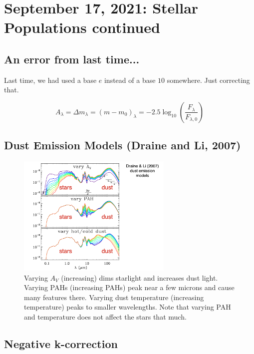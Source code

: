 \documentclass{article}
\begin{document}
\section{September 17, 2021: Stellar Populations continued}

\subsection{An error from last time...}

Last time, we had used a base $e$ instead of a base $10$ somewhere. Just correcting that. 

\begin{equation}
    A_\lambda = \Delta m_\lambda = \left(m-m_0\right)_\lambda = -2.5\log_{10}\left(\frac{F_\lambda}{F_{\lambda,0}}\right)
\end{equation}

\subsection{Dust Emission Models (Draine and Li, 2007)}

\begin{figure}
    \centering
    \includegraphics[width=0.66\textwidth]{figs/Screen Shot 2021-09-24 at 9.29.29 AM.png}
    \caption{Varying $A_V$ (increasing) dims starlight and increases dust light. Varying PAHs (increasing PAHs) peak near a few microns and cause many features there. Varying dust temperature (increasing temperature) peaks to smaller wavelengths. Note that varying PAH and temperature does not affect the stars that much. }
    \label{fig:dust_emission_variance}
\end{figure}

\subsection{Negative k-correction}
\end{document}
